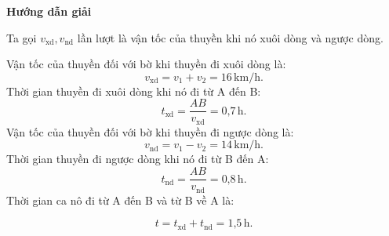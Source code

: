 {	\begin{center}
		\textbf{Hướng dẫn giải}
	\end{center}
	
	Ta gọi $v_{\text{xd}}, v_{\text{nd}}$ lần lượt là vận tốc của thuyền khi nó xuôi dòng và ngược dòng.
	
	Vận tốc của thuyền đối với bờ khi thuyền đi xuôi dòng là:
	$$v_{\text{xd}}=v_1+v_2 = 16\,\textrm{km/h}.$$
	Thời gian thuyền đi xuôi dòng khi nó đi từ A đến B:
	$$t_{\text{xd}}=\dfrac{AB}{v_{\text{xd}}}=\text{0,7} \,\text{h}.$$
	Vận tốc của thuyền đối với bờ khi thuyền đi ngược dòng là:
	$$v_{\text{nd}}=v_1-v_2 = 14\,\textrm{km/h}.$$
	Thời gian thuyền đi ngược dòng khi nó đi từ B đến A:
	$$t_{\text{nd}}=\dfrac{AB}{v_{\text{nd}}}=\text{0,8}\, \text{h}.$$
	Thời gian ca nô đi từ A đến B và từ B về A là:
	
	$$t= t_{\text{xd}}+ t_{\text{nd}}=\text{1,5}\,\text{h}.$$
}

